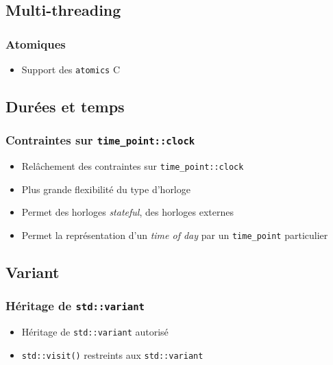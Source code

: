 \documentclass[C++.tex]{subfiles}
\begin{document}
\subsection*{Multi-threading}
\begin{frame}[fragile]
	\frametitle{Atomiques}
	\begin{itemize}
		\item Support des \lstinline|atomics| C
	\end{itemize}
\end{frame}

\subsection*{Durées et temps}
\begin{frame}[fragile]
	\frametitle{Contraintes sur \lstinline|time_point::clock|}
	\begin{itemize}
		\item Relâchement des contraintes sur \lstinline|time_point::clock|
		\item Plus grande flexibilité du type d'horloge
		\item Permet des horloges \textit{stateful}, des horloges externes
		\item Permet la représentation d'un \textit{time of day} par un \lstinline|time_point| particulier
	\end{itemize}
\end{frame}

\subsection*{Variant}
\begin{frame}[fragile]
	\frametitle{Héritage de \lstinline|std::variant|}
	\begin{itemize}
		\item Héritage de \lstinline|std::variant| autorisé
		\item \lstinline|std::visit()| restreints aux \lstinline|std::variant|

	\end{itemize}
\end{frame}
\end{document}
